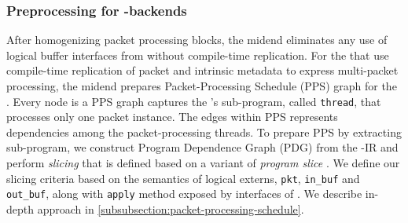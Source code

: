 \documentclass[letterpaper,twocolumn,10pt]{article}
\begin{document}



\subsubsection{Preprocessing for \ucomp-backends}
After homogenizing packet processing blocks, the midend eliminates 
any use of logical buffer interfaces from \uprograms without 
compile-time replication. For the \uprogram that use compile-time 
replication of packet and intrinsic metadata to express multi-packet 
processing, the midend prepares Packet-Processing Schedule (PPS) 
graph for the \uprogram. Every node is a PPS graph captures the 
\uprogram's sub-program, called \texttt{thread}, that processes only 
one packet instance. The edges within PPS represents dependencies 
among the packet-processing threads.
To prepare PPS by extracting sub-program, we construct 
Program Dependence Graph (PDG) \cite{Ferrante:1987:PDG:24039.24041} 
from the \uprogram-IR and perform \emph{slicing} that is defined based 
on a variant of \emph{program slice} 
\cite{Weiser:1981:PS:800078.802557}.
We define our slicing criteria based on the semantics of logical 
externs, \texttt{pkt}, \texttt{in\_buf} and \texttt{out\_buf}, along 
with \texttt{apply} method exposed by interfaces of \uarch. We 
describe in-depth approach in 
\cref{subsubsection:packet-processing-schedule}.
\end{document}
